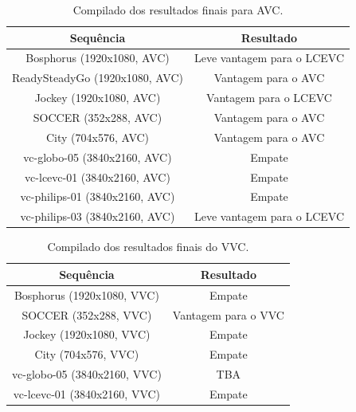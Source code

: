 \begin{table}[h]
    \centering
    \begin{tabular}{|c|c|}
        \hline
        \textbf{Sequência} & \textbf{Resultado}\\
        \hline
        Bosphorus (1920x1080, AVC) & Leve vantagem para o LCEVC\\
        \hline
        ReadySteadyGo (1920x1080, AVC) & Vantagem para o AVC\\
        \hline
        Jockey (1920x1080, AVC) & Vantagem para o LCEVC\\
        \hline
        SOCCER (352x288, AVC) & Vantagem para o AVC\\
        \hline
        City (704x576, AVC) & Vantagem para o AVC\\
        \hline
        vc-globo-05 (3840x2160, AVC) & Empate\\
        \hline
        vc-lcevc-01 (3840x2160, AVC) & Empate\\
        \hline
        vc-philips-01 (3840x2160, AVC) & Empate\\
        \hline
        vc-philips-03 (3840x2160, AVC) & Leve vantagem para o LCEVC\\
        \hline
    \end{tabular}
    \caption{Compilado dos resultados finais para AVC.}
    \label{tab:results-avc}
\end{table}

\begin{table}[h]
    \centering
    \begin{tabular}{|c|c|}
        \hline
        \textbf{Sequência} & \textbf{Resultado}\\
        \hline
        Bosphorus (1920x1080, VVC) & Empate\\
        \hline
        SOCCER (352x288, VVC) & Vantagem para o VVC\\
        \hline
        Jockey (1920x1080, VVC) & Empate\\
        \hline
        City (704x576, VVC) & Empate\\
        \hline
        vc-globo-05 (3840x2160, VVC) & TBA\\
        \hline
        vc-lcevc-01 (3840x2160, VVC) & Empate\\
        \hline
    \end{tabular}
    \caption{Compilado dos resultados finais do VVC.}
    \label{tab:results-vvc}
\end{table}